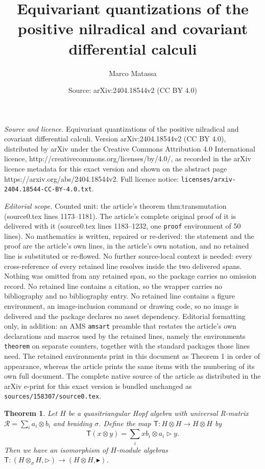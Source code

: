 \documentclass[10pt,a4paper]{amsart}
\title{Equivariant quantizations of the positive nilradical and covariant differential calculi}
\author{Marco Matassa}
\date{Source: arXiv:2404.18544v2 (CC BY 4.0)}
\newtheorem{theorem}{Theorem}
\newcommand{\calR}{\mathcal{R}}
\newcommand{\tmap}{\mathsf{T}}
\begin{document}
\maketitle

\noindent\emph{Source and licence.} Equivariant quantizations of the positive nilradical and covariant differential calculi. Version arXiv:2404.18544v2 (CC BY 4.0), distributed by arXiv under the Creative Commons Attribution 4.0 International licence, http://creativecommons.org/licenses/by/4.0/, as recorded in the arXiv licence metadata for this exact version and shown on the abstract page https://arxiv.org/abs/2404.18544v2. Full licence notice: \texttt{licenses/arxiv-2404.18544-CC-BY-4.0.txt}.\par\smallskip

\noindent\textit{Editorial scope.} Counted unit: the article's theorem thm:transmutation (source0.tex lines 1173--1181). The article's complete original proof of it is delivered with it (source0.tex lines 1183--1232, one \texttt{proof} environment of 50 lines). No mathematics is written, repaired or re-derived: the statement and the proof are the article's own lines, in the article's own notation, and no retained line is substituted or re-flowed.  No further source-local context is needed: every cross-reference of every retained line resolves inside the two delivered spans.  Nothing was omitted from any retained span, so the package carries no omission record.  No retained line contains a citation, so the wrapper carries no bibliography and no bibliography entry.  No retained line contains a figure environment, an image-inclusion command or drawing code, so no image is delivered and the package declares no asset dependency.  Editorial formatting only, in addition: an AMS \texttt{amsart} preamble that restates the article's own declarations and macros used by the retained lines, namely the environments \texttt{theorem} on separate counters, together with the standard packages those lines need.  The retained environments print in this document as Theorem 1 in order of appearance, whereas the article prints the same items with the numbering of its own full document.  The complete native source of the article as distributed in the arXiv e-print for this exact version is bundled unchanged as \texttt{sources/158307/source0.tex}.
\begin{theorem}
\label{thm:transmutation}
Let $H$ be a quasitriangular Hopf algebra with universal R-matrix $\calR = \sum_i a_i \otimes b_i$ and braiding $\sigma$.
Define the map $\tmap: H \otimes H \to H \otimes H$ by
\[
\tmap(x \otimes y) = \sum_i x b_i \otimes a_i \triangleright y.
\]
Then we have an isomorphism of $H$-module algebras $\tmap: (H \otimes_\sigma H, \triangleright) \to (H \otimes H, \blacktriangleright)$.
\end{theorem}
\end{document}
